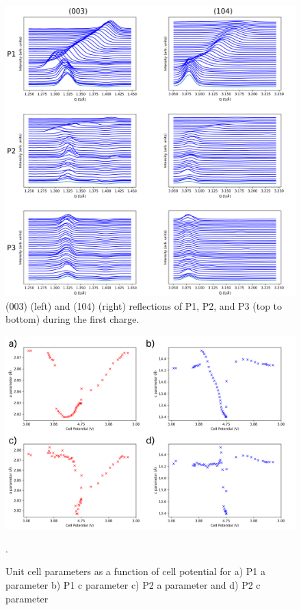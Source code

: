 \documentclass{article}
\begin{document}
\begin{figure}
  \includegraphics[width=\linewidth]{figures/ind-peaks.png}
  \caption{(003) (left) and (104) (right) reflections of P1, P2, and P3
    (top to bottom) during the first charge.}
  \label{fig:ind-peaks}
\end{figure}


\begin{figure}
  \includegraphics[width=\linewidth]{figures/cell-pars.png}
  \caption{Unit cell parameters as a function of cell potential for a)
  P1 a parameter b) P1 c parameter c) P2 a parameter and d) P2 c parameter}.
  \label{fig:cell-pars}
\end{figure}
\end{document}
